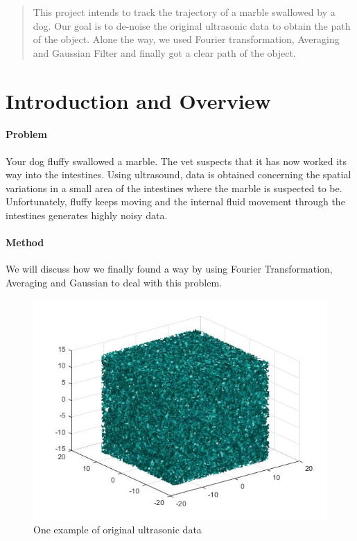 \documentclass[12pt]{article}
\begin{document}
\maketitle

\begin{abstract}
This project intends to track the trajectory of a marble swallowed by a dog. Our goal is to de-noise the original ultrasonic data to obtain the path of the object. Alone the way, we used Fourier transformation, Averaging and Gaussian Filter and finally got a clear path of the object.
\end{abstract}

\section{Introduction and Overview}


\paragraph{Problem}
Your dog fluffy swallowed a marble. The vet suspects that it has now worked its way into the intestines.
Using ultrasound, data is obtained concerning the spatial variations in a small area of the intestines where the
marble is suspected to be. Unfortunately, fluffy keeps moving and the internal fluid movement through the
intestines generates highly noisy data.
\paragraph{Method}
We will discuss how we finally found a way by using Fourier Transformation, Averaging and Gaussian to deal with this problem.
\begin{figure}[H]
  \includegraphics[width=0.7\linewidth]{original_data_1.jpg}
  \caption{One example of original ultrasonic data}
  \label{fig:original_data}
\end{figure}
\end{document}
